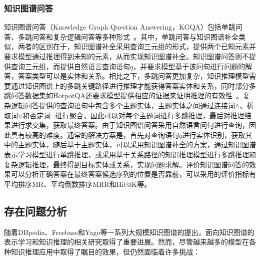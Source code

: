 \documentclass[algorithmlist, AutoFakeBold, AutoFakeSlant, figurelist, tablelist, nomlist, masters]{seuthesix}
\begin{document}
\subsubsection{知识图谱问答}
知识图谱问答（Knowledge Graph Question Answering，KGQA）包括单跳问答、多跳问答和复杂逻辑问答等多种形式~\cite{saxena2020improving}。其中，单跳问答与知识图谱补全类似，两者的区别在于，知识图谱补全采用查询三元组的形式，提供两个已知元素并要求模型通过推理得到未知的元素，从而实现知识图谱补全。知识图谱问答则不提供查询三元组，而提供自然语言查询语句$q$，并要求模型基于该问句进行问题的解答，答案类型可以是实体和关系。相比之下，多跳问答更加复杂，知识推理模型需要通过知识图谱上的多跳关键路径进行推理才能获得答案实体和关系，同时部分多跳问答数据集如HotpotQA还要求模型提供相应的证据来证明推理的有效性~\cite{yang2018hotpotqa}。复杂逻辑问答提供的查询语句中包含多个主题实体，主题实体之间通过连接词$\land$、析取词$\vee$和否定词$\neg$进行聚合，因此可以对每个主题词进行多跳推理，最后对推理结果进行求交集，获取最终答案。由于知识图谱问答采用自然语言问句进行查询，因此具有较高的难度。通常的解决方案是，首先对查询语句$q$进行实体识别，获取其中的主题实体，随后基于主题实体，可以采用知识图谱补全的方案，通过知识图谱表示学习模型进行单跳推理，或采用基于关系路径的知识推理模型进行多跳推理和复杂逻辑推理，最终得到目标实体或关系，实现问题求解。评价知识图谱问答的效果可以分析正确答案在最终答案候选序列的位置是否靠前，可以采用的评价指标有平均排序MR、平均倒数排序MRR和Hit@K等。

\subsection{存在问题分析}
随着DBpedia、Freebase和Yago等一系列大规模知识图谱的提出，面向知识图谱的表示学习和知识推理的相关研究取得了重要进展。然而，尽管越来越多的模型在各种知识推理应用中取得了瞩目的效果，但仍然面临着许多挑战：
\end{document}
